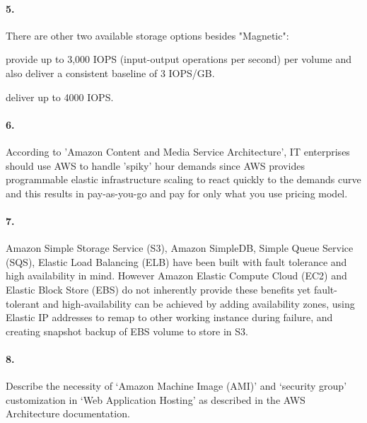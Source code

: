 \documentclass[a4paper]{article}
\begin{document}
\paragraph{5. } There are other two available storage options besides "Magnetic":
\begin{description}
\leftskip 0.4in
\parindent -0.4in
	\item[General Purpose (SSD): ] provide up to 3,000 IOPS (input-output operations per second) per volume and also deliver a consistent baseline of 3 IOPS/GB.
	\item[Provisioned IOPS (SSD): ] deliver up to 4000 IOPS.
\end{description}

\paragraph{6. } According to 'Amazon Content and Media Service Architecture', IT enterprises should use AWS to handle 'spiky' hour demands since AWS provides programmable elastic infrastructure scaling to react quickly to the demands curve and this results in pay-as-you-go and pay for only what you use pricing model.

\paragraph{7. } Amazon Simple Storage Service (S3), Amazon SimpleDB, Simple Queue Service (SQS), Elastic Load Balancing (ELB) have been built with fault tolerance and high availability in mind. However Amazon Elastic Compute Cloud (EC2) and Elastic Block Store (EBS) do not inherently provide these benefits yet fault-tolerant and high-availability can be achieved by adding availability zones, using Elastic IP addresses to remap to other working instance during failure, and creating snapshot backup of EBS volume to store in S3.

\paragraph{8. } Describe the necessity of ‘Amazon Machine Image (AMI)’ and ‘security group’ customization in ‘Web Application Hosting’ as described in the AWS Architecture documentation.
\end{document}
